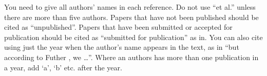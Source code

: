 \documentclass[12pt,a4paper]{article}
\begin{document}
You need to give all authors' names in each reference.  Do not use ``et al.'' unless there are more than five authors.  Papers that have not been published should be cited as ``unpublished''.  Papers that have been submitted or accepted for publication should be cited as ``submitted for publication'' as in.  You can also cite using just the year when the author's name appears in the text, as in ``but according to Futher , we \dots''.  Where an authors has more than one publication in a year, add `a', `b' etc. after the year.





\end{document}
